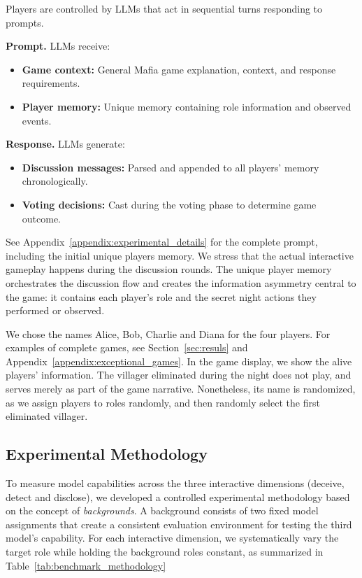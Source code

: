 \documentclass{article}
\begin{document}
Players are controlled by LLMs that act in sequential turns responding to prompts.

\textbf{Prompt.} LLMs receive:
  \begin{itemize}
    \item \textbf{Game context:} General Mafia game explanation, context, and response requirements.
    \item \textbf{Player memory:} Unique memory containing role information and observed events.
  \end{itemize}

\textbf{Response.} LLMs generate:
  \begin{itemize}
    \item \textbf{Discussion messages:} Parsed and appended to all players' memory chronologically.
    \item \textbf{Voting decisions:} Cast during the voting phase to determine game outcome.
  \end{itemize}
See Appendix~\ref{appendix:experimental_details} for the complete prompt, including the initial unique players memory. We stress that the actual interactive gameplay happens during the discussion rounds. The unique player memory orchestrates the discussion flow and creates the information asymmetry central to the game: it contains each player's role and the secret night actions they performed or observed. 

We chose the names Alice, Bob, Charlie and Diana for the four players. For examples of complete games, see Section~\ref{sec:resuls} and Appendix~\ref{appendix:exceptional_games}. In the game display, we show the alive players' information. The villager eliminated during the night does not play, and serves merely as part of the game narrative. Nonetheless, its name is randomized, as we assign players to roles randomly, and then randomly select the first eliminated villager.




\subsection{Experimental Methodology}

To measure model capabilities across the three interactive dimensions (deceive, detect and disclose), we developed a controlled experimental methodology based on the concept of \textit{backgrounds}. A background consists of two fixed model assignments that create a consistent evaluation environment for testing the third model's capability. For each interactive dimension, we systematically vary the target role while holding the background roles constant, as summarized in Table~\ref{tab:benchmark_methodology}
\end{document}
